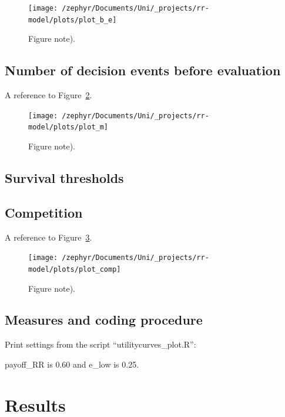 \documentclass[british,,man,floatsintext]{apa6}
\begin{document}
\begin{figure}
\texttt{[image: /zephyr/Documents/Uni/\_projects/rr-model/plots/plot\_b\_e]} \caption{Figure note).}\label{fig:epsilonplot}
\end{figure}

\hypertarget{number-of-decision-events-before-evaluation-1}{%
\subsection{Number of decision events before evaluation}\label{number-of-decision-events-before-evaluation-1}}

A reference to Figure~\ref{fig:mplot}.



\begin{figure}
\texttt{[image: /zephyr/Documents/Uni/\_projects/rr-model/plots/plot\_m]} \caption{Figure note).}\label{fig:mplot}
\end{figure}

\hypertarget{survival-thresholds}{%
\subsection{Survival thresholds}\label{survival-thresholds}}

\hypertarget{competition}{%
\subsection{Competition}\label{competition}}

A reference to Figure~\ref{fig:competitionplot}.



\begin{figure}
\texttt{[image: /zephyr/Documents/Uni/\_projects/rr-model/plots/plot\_comp]} \caption{Figure note).}\label{fig:competitionplot}
\end{figure}

\hypertarget{measures-and-coding-procedure}{%
\subsection{Measures and coding procedure}\label{measures-and-coding-procedure}}

Print settings from the script \enquote{utilitycurves\_plot.R}:

payoff\_RR is \(0.60\) and e\_low is 0.25.

\hypertarget{results-1}{%
\section{Results}\label{results-1}}
\end{document}

